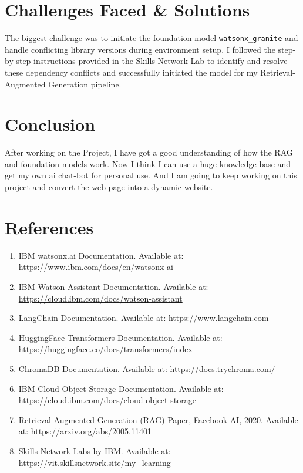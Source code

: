 \documentclass[12pt]{article}
\begin{document}
\section{Challenges Faced \& Solutions}

The biggest challenge was to initiate the foundation model \texttt{watsonx\_granite} and handle conflicting library versions during environment setup.
\newline
I followed the step-by-step instructions provided in the Skills Network Lab to identify and resolve these dependency conflicts and successfully initiated the model for my Retrieval-Augmented Generation pipeline.



\section{Conclusion}
After working on the Project, I have got a good understanding of how the RAG and foundation models work.
Now I think I can use a huge knowledge base and get my own ai chat-bot for personal use. And I am going to keep working on this project and convert the web page into a dynamic website.

\section{References}

\begin{enumerate}
    \item IBM watsonx.ai Documentation. Available at: \url{https://www.ibm.com/docs/en/watsonx-ai}
    \item IBM Watson Assistant Documentation. Available at: \url{https://cloud.ibm.com/docs/watson-assistant}
    \item LangChain Documentation. Available at: \url{https://www.langchain.com}
    \item HuggingFace Transformers Documentation. Available at: \url{https://huggingface.co/docs/transformers/index}
    \item ChromaDB Documentation. Available at: \url{https://docs.trychroma.com/}
    \item IBM Cloud Object Storage Documentation. Available at: \url{https://cloud.ibm.com/docs/cloud-object-storage}
    \item Retrieval-Augmented Generation (RAG) Paper, Facebook AI, 2020. Available at: \url{https://arxiv.org/abs/2005.11401}
    \item Skills Network Labs by IBM. Available at: \url{https://vit.skillsnetwork.site/my_learning}
\end{enumerate}
\end{document}
